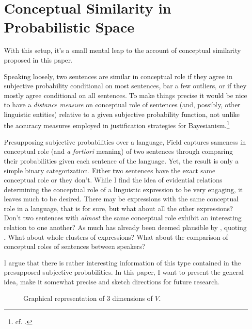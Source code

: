 \documentclass[11pt, a4paper]{scrartcl}
\renewcommand{\i}[1]{\emph{#1}}
\newcommand{\m}[1]{\textswab{#1}}
\begin{document}
\section{Conceptual Similarity in Probabilistic Space}

With this setup, it's a small mental leap to the account of conceptual similarity proposed in this paper. 

Speaking loosely, two sentences are similar in conceptual role if they agree in subjective probability conditional on most sentences, bar a few outliers, or if they mostly agree conditional on all sentences. To make things precise it would be nice to have a \i{distance measure} on conceptual role of sentences (and, possibly, other linguistic entities) relative to a given subjective probability function, not unlike the accuracy measures employed in justification strategies for Bayesianism.\footnote{cf. \textcite{Leitgeb2010}.}

Presupposing subjective probabilities over a language, Field captures sameness in conceptual role (and \i{a fortiori} meaning) of two sentences through comparing their probabilities given each sentence of the language. Yet, the result is only a simple binary categorization. Either two sentences have the exact same conceptual role or they don't. While I find the idea of evidential relations determining the conceptual role of a linguistic expression to be very engaging, it leaves much to be desired. There may be expressions with the same conceptual role in a language, that is for sure, but what about all the other expressions? Don't two sentences with \i{almost} the same conceptual role exhibit an interesting relation to one another? As much has already been deemed plausible by \textcite{Leitgeb2008-LEIAIR}, quoting \textcite{Goodman1949-GOOOLO}. What about whole clusters of expressions? What about the comparison of conceptual roles of sentences between speakers? 

I argue that there is rather interesting information of this type contained in the presupposed subjective probabilities. In this paper, I want to present the general idea, make it somewhat precise and sketch directions for future research.

\begin{figure}
    \centering
{}
\caption{Graphical representation of 3 dimensions of $V$.}
\end{figure}
\end{document}

